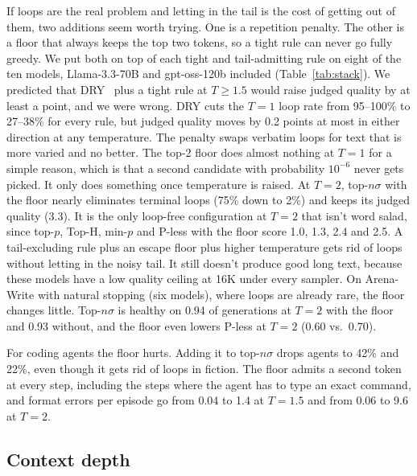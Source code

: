 \documentclass{article}
\newcommand{\pless}{P-less}
\begin{document}
If loops are the real problem and letting in the tail is the cost of getting out of them, two additions seem worth trying. One is a repetition penalty. The other is a floor that always keeps the top two tokens, so a tight rule can never go fully greedy. We put both on top of each tight and tail-admitting rule on eight of the ten models, Llama-3.3-70B and gpt-oss-120b included (Table~\ref{tab:stack}). We predicted that DRY~\citep{weidmann2024dry} plus a tight rule at $T{\ge}1.5$ would raise judged quality by at least a point, and we were wrong. DRY cuts the $T{=}1$ loop rate from 95--100\% to 27--38\% for every rule, but judged quality moves by 0.2 points at most in either direction at any temperature. The penalty swaps verbatim loops for text that is more varied and no better. The top-2 floor does almost nothing at $T{=}1$ for a simple reason, which is that a second candidate with probability $10^{-6}$ never gets picked. It only does something once temperature is raised. At $T{=}2$, top-$n\sigma$ with the floor nearly eliminates terminal loops (75\% down to 2\%) and keeps its judged quality (3.3). It is the only loop-free configuration at $T{=}2$ that isn't word salad, since top-$p$, Top-H, min-$p$ and \pless{} with the floor score 1.0, 1.3, 2.4 and 2.5. A tail-excluding rule plus an escape floor plus higher temperature gets rid of loops without letting in the noisy tail. It still doesn't produce good long text, because these models have a low quality ceiling at 16K under every sampler. On Arena-Write with natural stopping (six models), where loops are already rare, the floor changes little. Top-$n\sigma$ is healthy on 0.94 of generations at $T{=}2$ with the floor and 0.93 without, and the floor even lowers \pless{} at $T{=}2$ (0.60 vs.\ 0.70).

For coding agents the floor hurts. Adding it to top-$n\sigma$ drops agents to 42\% and 22\%, even though it gets rid of loops in fiction. The floor admits a second token at every step, including the steps where the agent has to type an exact command, and format errors per episode go from 0.04 to 1.4 at $T{=}1.5$ and from 0.06 to 9.6 at $T{=}2$.

\subsection{Context depth}
\label{sec:depth}
\end{document}
